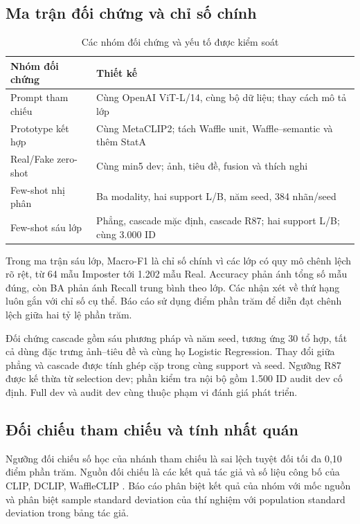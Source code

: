 \documentclass[12pt,a4paper]{article}
\newcommand{\BodySize}{13}
\newcommand{\BodyLeading}{15.6}
\newcommand{\BodyFont}{\fontsize{\BodySize}{\BodyLeading}\selectfont}
\numberwithin{figure}{section}
\numberwithin{table}{section}
\numberwithin{equation}{section}
\begin{document}
\subsection{Ma trận đối chứng và chỉ số chính}
\begin{table}[H]\centering\BodyFont
\caption{Các nhóm đối chứng và yếu tố được kiểm soát}
\begin{tabularx}{\linewidth}{@{}p{.26\linewidth}L@{}}\toprule
Nhóm đối chứng & Thiết kế\\\midrule
Prompt tham chiếu & Cùng OpenAI ViT-L/14, cùng bộ dữ liệu; thay cách mô tả lớp\\
Prototype kết hợp & Cùng MetaCLIP2; tách Waffle unit, Waffle--semantic và thêm StatA\\
Real/Fake zero-shot & Cùng min5 dev; ảnh, tiêu đề, fusion và thích nghi\\
Few-shot nhị phân & Ba modality, hai support L/B, năm seed, 384 nhãn/seed\\
Few-shot sáu lớp & Phẳng, cascade mặc định, cascade R87; hai support L/B; cùng 3.000 ID\\\bottomrule
\end{tabularx}
\end{table}

Trong ma trận sáu lớp, Macro-F1 là chỉ số chính vì các lớp có quy mô chênh lệch rõ rệt, từ 64 mẫu Imposter tới 1.202 mẫu Real. Accuracy phản ánh tổng số mẫu đúng, còn BA phản ánh Recall trung bình theo lớp. Các nhận xét về thứ hạng luôn gắn với chỉ số cụ thể. Báo cáo sử dụng điểm phần trăm để diễn đạt chênh lệch giữa hai tỷ lệ phần trăm.

Đối chứng cascade gồm sáu phương pháp và năm seed, tương ứng 30 tổ hợp, tất cả dùng đặc trưng ảnh--tiêu đề và cùng họ Logistic Regression. Thay đổi giữa phẳng và cascade được tính ghép cặp trong cùng support và seed. Ngưỡng R87 được kế thừa từ selection dev; phần kiểm tra nội bộ gồm 1.500 ID audit dev cố định. Full dev và audit dev cùng thuộc phạm vi đánh giá phát triển.

\subsection{Đối chiếu tham chiếu và tính nhất quán}
Ngưỡng đối chiếu số học của nhánh tham chiếu là sai lệch tuyệt đối tối đa 0,10 điểm phần trăm. Nguồn đối chiếu là các kết quả tác giả và số liệu công bố của CLIP, DCLIP, WaffleCLIP \cite{clip,dclip,waffle}. Báo cáo phân biệt kết quả của nhóm với mốc nguồn và phân biệt sample standard deviation của thí nghiệm với population standard deviation trong bảng tác giả.
\end{document}
